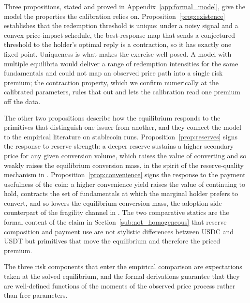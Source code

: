 Three propositions, stated and proved in Appendix~\ref{app:formal_model}, give the model the properties the calibration relies on. Proposition~\ref{prop:existence} establishes that the redemption threshold is unique: under a noisy signal and a convex price-impact schedule, the best-response map that sends a conjectured threshold to the holder's optimal reply is a contraction, so it has exactly one fixed point. Uniqueness is what makes the exercise well posed. A model with multiple equilibria would deliver a range of redemption intensities for the same fundamentals and could not map an observed price path into a single risk premium; the contraction property, which we confirm numerically at the calibrated parameters, rules that out and lets the calibration read one premium off the data.

The other two propositions describe how the equilibrium responds to the primitives that distinguish one issuer from another, and they connect the model to the empirical literature on stablecoin runs. Proposition~\ref{prop:reserves} signs the response to reserve strength: a deeper reserve sustains a higher secondary price for any given conversion volume, which raises the value of converting and so weakly raises the equilibrium conversion mass, in the spirit of the reserve-quality mechanism in \citet{ma_zeng_zhang_2025}. Proposition~\ref{prop:convenience} signs the response to the payment usefulness of the coin: a higher convenience yield raises the value of continuing to hold, contracts the set of fundamentals at which the marginal holder prefers to convert, and so lowers the equilibrium conversion mass, the adoption-side counterpart of the fragility channel in \citet{bertsch_2025_adoption_fragility}. The two comparative statics are the formal content of the claim in Section~\ref{sub:not_homogeneous} that reserve composition and payment use are not stylistic differences between USDC and USDT but primitives that move the equilibrium and therefore the priced premium.

The three risk components that enter the empirical comparison are expectations taken at the solved equilibrium, and the formal derivations guarantee that they are well-defined functions of the moments of the observed price process rather than free parameters.
